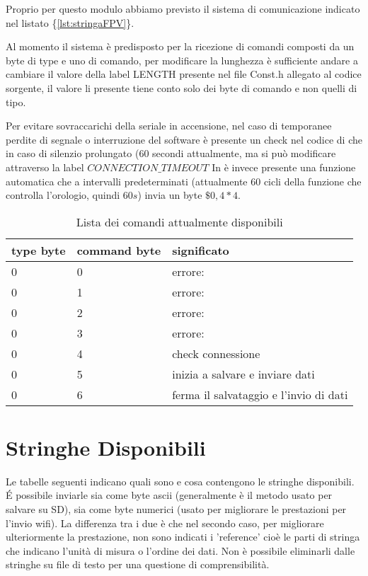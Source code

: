 Proprio per questo modulo abbiamo previsto il sistema di comunicazione indicato nel listato \{\ref{lst:stringaFPV}\}.

Al momento il sistema è predisposto per la ricezione di comandi composti da un byte di type e uno di comando, per modificare la lunghezza è sufficiente andare a cambiare il valore della label LENGTH presente nel file Const.h allegato al codice sorgente, il valore li presente tiene conto solo dei byte di comando e non quelli di tipo.

Per evitare sovraccarichi della seriale in accensione, nel caso di temporanee perdite di segnale o interruzione del software è presente un check nel codice di \name che in caso di silenzio prolungato ($60$ secondi attualmente, ma si può modificare attraverso la label $CONNECTION\_TIMEOUT$ In \software è invece presente una funzione automatica che a intervalli predeterminati (attualmente $60$ cicli della funzione che controlla l'orologio, quindi $60s$) invia un byte $\$0,4*4$.

\begin{table}
	\begin{center}
		\begin{tabular}{|l|l|l|}
			\hline
			type byte & command byte & significato\\
			\hline
			\hline
			0 & 0 & errore:\\
			0 & 1 & errore:\\
			0 & 2 & errore:\\
			0 & 3 & errore:\\
			0 & 4 & check connessione\\
			0 & 5 & inizia a salvare e inviare dati\\
			0 & 6 & ferma il salvataggio e l'invio di dati\\
			\hline
		\end{tabular}
	\end{center}
	\caption{Lista dei comandi attualmente disponibili} 
	\label{tab:comandiFPV}
\end{table}

\section{Stringhe Disponibili}
Le tabelle seguenti indicano quali sono e cosa contengono le stringhe disponibili. \'E possibile inviarle sia come byte ascii (generalmente è il metodo usato per salvare su SD), sia come byte numerici (usato per migliorare le prestazioni per l'invio wifi).
La differenza tra i due è che nel secondo caso, per migliorare ulteriormente la prestazione, non sono indicati i 'reference' cioè le parti di stringa che indicano l'unità di misura o l'ordine dei dati. Non è possibile eliminarli dalle stringhe su file di testo per una questione di comprensibilità.

